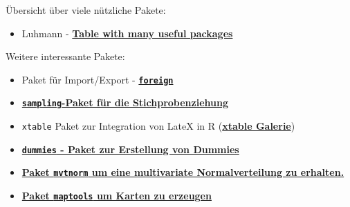 \documentclass[ignorenonframetext,]{beamer}
\providecommand{\tightlist}{%
  \setlength{\itemsep}{0pt}\setlength{\parskip}{0pt}}
\begin{document}
\begin{frame}[fragile]{Übersicht über viele nützliche Pakete:}
\protect\hypertarget{ubersicht-uber-viele-nutzliche-pakete}{}

\begin{itemize}
\tightlist
\item
  Luhmann -
  \href{http://www.beltz.de/fileadmin/beltz/downloads/OnlinematerialienPVU/28090_Luhmann/Verwendete\%20Pakete.pdf}{\textbf{Table
  with many useful packages}}
\end{itemize}

\begin{block}{Weitere interessante Pakete:}

\begin{itemize}
\item
  Paket für Import/Export -
  \href{http://cran.r-project.org/web/packages/foreign/foreign.pdf}{\textbf{\texttt{foreign}}}
\item
  \href{http://iase-web.org/documents/papers/icots8/ICOTS8_4J1_TILLE.pdf}{\textbf{\texttt{sampling}-Paket
  für die Stichprobenziehung}}
\item
  \texttt{xtable} Paket zur Integration von LateX in R
  (\href{http://cran.r-project.org/web/packages/xtable/vignettes/xtableGallery.pdf}{\textbf{xtable
  Galerie}})
\item
  \href{http://cran.r-project.org/web/packages/dummies/dummies.pdf}{\textbf{\texttt{dummies}
  - Paket zur Erstellung von Dummies}}
\item
  \href{http://cran.r-project.org/web/packages/mvtnorm/index.html}{\textbf{Paket
  \texttt{mvtnorm} um eine multivariate Normalverteilung zu erhalten. }}
\item
  \href{http://www.r-bloggers.com/tag/maptools/}{\textbf{Paket
  \texttt{maptools} um Karten zu erzeugen}}
\end{itemize}

\end{block}

\end{frame}
\end{document}
